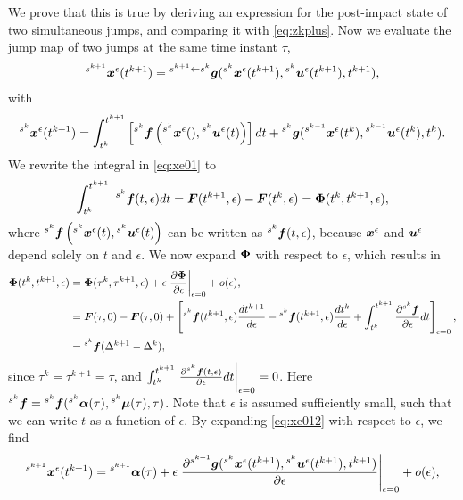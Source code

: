 \documentclass[../DC2017114Bouma.tex]{subfiles}
\begin{document}
We prove that this is true by deriving an expression for the post-impact state of two simultaneous jumps, and comparing it with \eqref{eq:zkplus}. Now we evaluate the jump map of two jumps at the same time instant $\tau$,
\begin{align}
\hspace{0cm}^{s^{k+1}}{\boldsymbol{x}}^\epsilon(t^{k+1}) = \hspace{0cm}^{s^{k+1}\leftarrow s^k}{\boldsymbol{g}}(\hspace{0cm}^{s^k}{\boldsymbol{x}}^{\epsilon}(t^{k+1}),\hspace{0cm}^{s^k}{\boldsymbol{u}}^\epsilon(t^{k+1}),t^{k+1}),\label{eq:xe012}
\end{align}
with
\begin{align}
\hspace{0cm}^{s^k}{\boldsymbol{x}}^{\epsilon}(t^{k+1}) = \int_{t^{k}}^{t^{k+1}}\left[\hspace{0cm}^{s^{k}}{\boldsymbol{f}}\left(\hspace{0cm}^{s^{k}}{\boldsymbol{x}}^\epsilon(),\hspace{0cm}^{s^{k}}{\boldsymbol{u}}^\epsilon(t)\right)\right]dt + \hspace{0cm}^{s^{k}}{\boldsymbol{g}}(\hspace{0cm}^{s^{k-1}}{\boldsymbol{x}}^\epsilon(t^{k}),\hspace{0cm}^{s^{k-1}}{\boldsymbol{u}}^\epsilon(t^{k}),t^{k}).\label{eq:xe01}
\end{align}
We rewrite the integral in \eqref{eq:xe01} to
\begin{align}
\int_{t^{k}}^{t^{k+1}}\ \hspace{0cm}^{s^{k}}{\boldsymbol{f}}(t,\epsilon)dt = {\boldsymbol{F}}(t^{k+1},\epsilon) - {\boldsymbol{F}}(t^{k},\epsilon) = \boldsymbol{\Phi}(t^{k},t^{k+1},\epsilon),
\end{align}
where $^{s^{k}}{\boldsymbol{f}}\left(\hspace{0cm}^{s^{k}}{\boldsymbol{x}}^\epsilon(t),\hspace{0cm}^{s^{k}}{\boldsymbol{u}}^\epsilon(t)\right)$ can be written as $\hspace{0cm}^{s^{k}}{\boldsymbol{f}}(t,\epsilon)$, because ${\boldsymbol{x}}^\epsilon$ and ${\boldsymbol{u}}^\epsilon$ depend solely on $t$ and $\epsilon$. We now expand $\boldsymbol{\Phi}$ with respect to $\epsilon$, which results in
\begin{align}
\boldsymbol{\Phi}(t^{k},t^{k+1},\epsilon) &= \boldsymbol{\Phi}(\tau^{k},\tau^{k+1},\epsilon) + \epsilon\left.\frac{\partial\boldsymbol{\Phi}}{\partial\epsilon}\right|_{\epsilon = 0} + o(\epsilon),\\
&= {\boldsymbol{F}}(\tau,0) - {\boldsymbol{F}}(\tau,0) + \left[\hspace{0cm}^{s^{k}}{\boldsymbol{f}}(t^{k+1},\epsilon)\frac{dt^{k+1}}{d\epsilon} - \hspace{0cm}^{s^{k}}{\boldsymbol{f}}(t^{k+1},\epsilon)\frac{dt^{k}}{d\epsilon} + \int_{t^{k}}^{t^{k+1}}\frac{\partial\hspace{0cm}^{s^{k}}{\boldsymbol{f}}}{\partial\epsilon}dt\right]_{\epsilon=0},\\
&= \hspace{0cm}^{s^{k}}{\boldsymbol{f}}(\Delta^{k+1}-\Delta^{k}), 
\end{align}
since $\tau^k = \tau^{k+1} = \tau$, and $\int_{t^{k}}^{t^{k+1}}\left.\frac{\partial\hspace{0cm}^{s^{k}}{\boldsymbol{f}}(t,\epsilon)}{\partial\epsilon}dt\right|_{\epsilon = 0} = 0$. Here $\hspace{0cm}^{s^{k}}{\boldsymbol{f}} = \hspace{0cm}^{s^{k}}{\boldsymbol{f}}(\hspace{0cm}^{s^{k}}\boldsymbol{\alpha}(\tau),\hspace{0cm}^{s^{k}}\boldsymbol{\mu}(\tau),\tau)$. Note that $\epsilon$ is assumed sufficiently small, such that we can write $t$ as a function of $\epsilon$. By expanding \eqref{eq:xe012} with respect to $\epsilon$, we find
\begin{align}
\hspace{0cm}^{s^{k+1}}{\boldsymbol{x}}^\epsilon(t^{k+1}) = \hspace{0cm}^{s^{k+1}}\boldsymbol{\alpha}(\tau) + \epsilon\left.\frac{\partial\hspace{0cm}^{s^{k+1}}{\boldsymbol{g}}(\hspace{0cm}^{s^{k}}{\boldsymbol{x}}^\epsilon(t^{k+1}),\hspace{0cm}^{s^{k}}{\boldsymbol{u}}^\epsilon(t^{k+1}),t^{k+1})}{\partial\epsilon}\right|_{\epsilon=0} + o(\epsilon),\label{eq:xe012exp}
\end{align}
\end{document}
